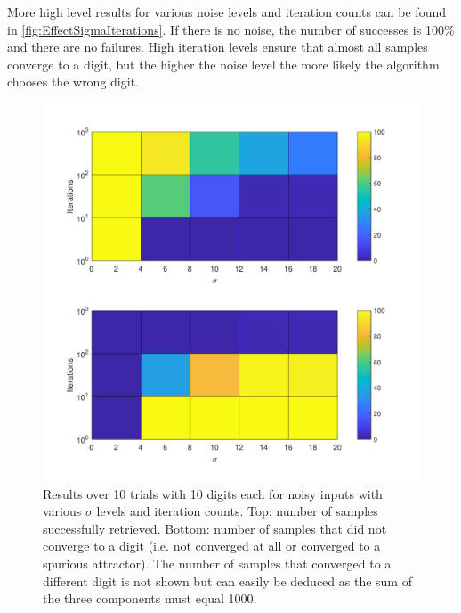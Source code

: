 \documentclass[a4, 10pt, twoside, twocolumn]{article}
\numberwithin{figure}{section}
\begin{document}
More high level results for various noise levels and iteration counts can be found in \autoref{fig:EffectSigmaIterations}. If there is no noise, the number of successes is 100\% and there are no failures. High iteration levels ensure that almost all samples converge to a digit, but the higher the noise level the more likely the algorithm chooses the wrong digit.

\begin{figure}[ht]
    \includegraphics[width=\linewidth]{img/EffectSigmaIterations.pdf}
    \caption{Results over 10 trials with 10 digits each for noisy inputs with various $\sigma$ levels and iteration counts. Top: number of samples successfully retrieved. Bottom: number of samples that did not converge to a digit (i.e. not converged at all or converged to a spurious attractor). The number of samples that converged to a different digit is not shown but can easily be deduced as the sum of the three components must equal 1000.}
    \label{fig:EffectSigmaIterations}
\end{figure}

\end{document}

